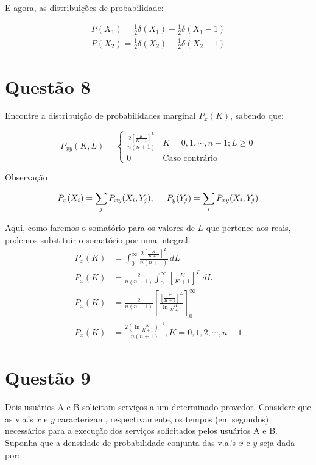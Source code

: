 \documentclass[a5paper]{report}
\begin{document}
E agora, as distribuições de probabilidade:

\begin{align*}
	P(X_1) = \frac{1}{2} \delta(X_1) + \frac{1}{2} \delta(X_1 - 1)\\
	P(X_2) = \frac{1}{2} \delta(X_2) + \frac{1}{2} \delta(X_2 - 1)
\end{align*}



\section*{Questão 8}
Encontre a distribuição de probabilidades marginal $P_x(K)$, sabendo que:

\begin{equation*}
	P_{xy}(K, L) = 
	\begin{cases}
		\frac{2\left[\frac{K}{K + 1}\right]^L}{n(n + 1)} & K = 0, 1, \cdots, n - 1; L \geq 0\\
		0 \hspace{1cm}                                   & \text{Caso contrário} 
	\end{cases}
\end{equation*}

Observação

\[
	P_x(X_i) = 	\sum_{j} P_{xy}(X_i, Y_j), \hspace{0.5cm}
	P_y(Y_j) =  \sum_{i} P_{xy}(X_i, Y_j)
\]

Aqui, como faremos o somatório para os valores de $L$ que pertence aos reais, podemos substituir o somatório por uma integral:
\begin{align*}
	P_x(K) &= \int_{0}^{\infty} \frac{2\left[\frac{K}{K + 1}\right]^L}{n(n + 1)} \, dL\\
	P_x(K) &= \frac{2}{n(n + 1)}\int_{0}^{\infty} \left[\frac{K}{K + 1}\right]^L \, dL\\
	P_x(K) &= \frac{2}{n(n + 1)} \left[\frac{\left[\frac{K}{K + 1}\right]^L}{\ln \frac{K}{K + 1}}\right]_{0}^{\infty}\\
	P_x(K) &= \frac{2 \left(\ln \frac{K}{K + 1}\right)^{-1}}{n(n + 1)}, K = 0, 1, 2, \cdots, n - 1
\end{align*}

\section*{Questão 9}
Dois usuários A e B solicitam serviços a um determinado provedor. Considere que as v.a.'s $x$ e $y$ caracterizam, respectivamente, os tempos (em segundos) necessários para a execução dos serviços solicitados pelos usuários A e B.
Suponha que a densidade de probabilidade conjunta das v.a.'s $x$ e $y$ seja dada por:
\end{document}
